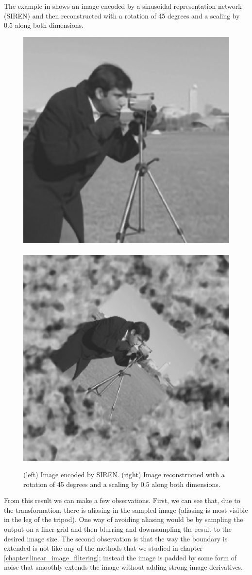 The example in \fig{\ref{fig:siren_rotation_and_scaling}} shows an image encoded by a sinusoidal representation network (SIREN) \cite{sitzmann2019siren} and then 
reconstructed with a rotation of 45 degrees and a scaling by 0.5 along both dimensions. 

\begin{figure}[t]
\centerline{
\includegraphics[width=.49\linewidth]{figures/imaging_geometry/siren_original_image.png}
~
\includegraphics[width=.49\linewidth]{figures/imaging_geometry/siren_rotation_and_scaling.png}
}
\caption{(left) Image encoded by SIREN. (right) Image reconstructed with a rotation of 45 degrees and a scaling by 0.5 along both dimensions.}
\label{fig:siren_rotation_and_scaling}
\end{figure}

From this result we can make a few observations. First, we can see that, due to the transformation, there is aliasing in the sampled image (aliasing is most visible in the leg of the tripod). One way of avoiding aliasing would be by sampling the output on a finer grid and then blurring and downsampling the result to the desired image size.
The second observation is that the way the boundary is extended is not like any of the methods that we studied in chapter \ref{chapter:linear_image_filtering}; instead the image is padded by some form of noise that smoothly extends the image without adding strong image derivatives.

